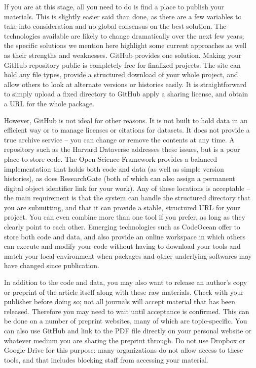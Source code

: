 If you are at this stage,
all you need to do is find a place to publish your materials.
This is slightly easier said than done,
as there are a few variables to take into consideration
and no global consensus on the best solution.
The technologies available are likely to change dramatically
over the next few years;
the specific solutions we mention here highlight some current approaches
as well as their strengths and weaknesses.
GitHub provides one solution.
Making your GitHub repository public
is completely free for finalized projects.
The site can hold any file types,
provide a structured download of your whole project,
and allow others to look at alternate versions or histories easily.
It is straightforward to simply upload a fixed directory to GitHub
apply a sharing license, and obtain a URL for the whole package.

However, GitHub is not ideal for other reasons.
It is not built to hold data in an efficient way
or to manage licenses or citations for datasets.
It does not provide a true archive service --
you can change or remove the contents at any time.
A repository such as the Harvard Dataverse
addresses these issues, but is a poor place to store code.
The Open Science Framework
provides a balanced implementation
that holds both code and data (as well as simple version histories),
as does ResearchGate
(both of which can also assign a permanent digital object identifier link for your work).
Any of these locations is acceptable --
the main requirement is that the system can handle
the structured directory that you are submitting,
and that it can provide a stable, structured URL for your project.
You can even combine more than one tool if you prefer,
as long as they clearly point to each other.
Emerging technologies such as CodeOcean
offer to store both code and data,
and also provide an online workspace in which others
can execute and modify your code
without having to download your tools and match your local environment
when packages and other underlying softwares may have changed since publication.

In addition to the code and data,
you may also want to release an author's copy or preprint
of the article itself along with these raw materials.
Check with your publisher before doing so;
not all journals will accept material that has been released.
Therefore you may need to wait until acceptance is confirmed.
This can be done on a number of preprint websites,
many of which are topic-specific.
You can also use GitHub and link to the PDF file directly
on your personal website or whatever medium you are
sharing the preprint through.
Do not use Dropbox or Google Drive for this purpose:
many organizations do not allow access to these tools,
and that includes blocking staff from accessing your material.

